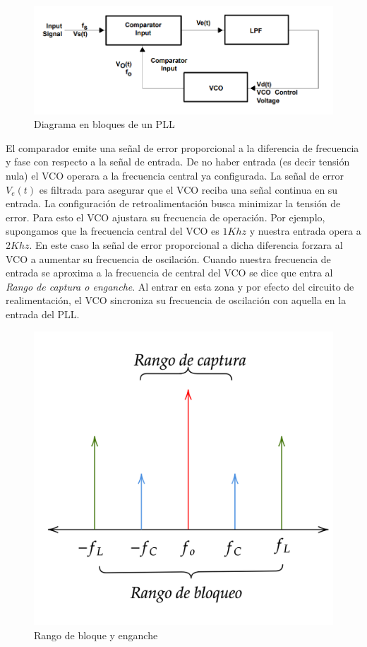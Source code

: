 	\begin{figure}[H]
		\includegraphics[width=\linewidth]{ImagenesVarias/PLLblockDiagram.PNG}
		\caption{Diagrama en bloques de un PLL}
	\end{figure}
El comparador emite una señal de error proporcional a la diferencia de frecuencia y fase con respecto a la señal de entrada. De no haber entrada (es decir tensión nula) el VCO operara a la frecuencia central ya configurada. La señal de error $V_e(t)$ es filtrada para asegurar que el VCO reciba una señal continua en su entrada. La configuración de retroalimentación busca minimizar la tensión de error. Para esto el VCO ajustara su frecuencia de operación. Por ejemplo, supongamos que la frecuencia central del VCO es $1Khz$ y nuestra entrada opera a $2Khz$. En este caso la señal de error proporcional a dicha diferencia forzara al VCO a aumentar su frecuencia de oscilación. Cuando nuestra frecuencia de entrada se aproxima a la frecuencia de central del VCO se dice que entra al \emph{Rango de captura o enganche}. Al entrar en esta zona y por efecto del circuito de realimentación, el VCO sincroniza su frecuencia de oscilación con aquella en la entrada del PLL.



\begin{figure}[H]
	\centering
	\includegraphics[scale=0.3]{ImagenesVarias/PLL_range2.png}
	\caption{Rango de bloque y enganche}
	\label{blockLockRange}
\end{figure}


